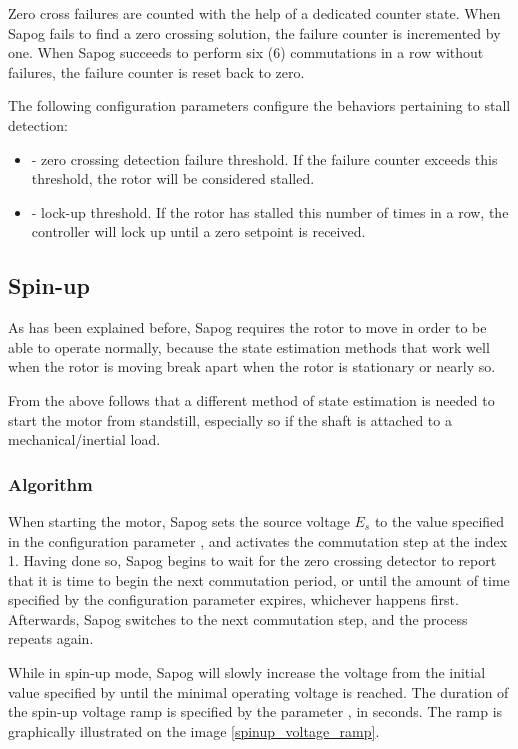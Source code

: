 \documentclass{zubaxdoc}
\begin{document}
Zero cross failures are counted with the help of a dedicated counter state.
When Sapog fails to find a zero crossing solution,
the failure counter is incremented by one.
When Sapog succeeds to perform six (6) commutations in a row without failures,
the failure counter is reset back to zero.

The following configuration parameters configure the behaviors pertaining to stall detection:

\begin{itemize}
\item {} - zero crossing detection failure threshold.
If the failure counter exceeds this threshold, the rotor will be considered stalled.
\item {} - lock-up threshold.
If the rotor has stalled this number of times in a row,
the controller will lock up until a zero setpoint is received.
\end{itemize}

\subsection{Spin-up}

As has been explained before, Sapog requires the rotor to move in order to be able to operate normally,
because the state estimation methods that work well when the rotor is moving break apart when the rotor is
stationary or nearly so.

From the above follows that a different method of state estimation is needed to start the motor
from standstill, especially so if the shaft is attached to a mechanical/inertial load.

\subsubsection{Algorithm}

When starting the motor, Sapog sets the source voltage $E_s$ to the value specified in the
configuration parameter , and activates the commutation step at the index 1.
Having done so, Sapog begins to wait for the zero crossing detector to report that it is time to
begin the next commutation period, or until the amount of time specified by the configuration parameter
 expires, whichever happens first.
Afterwards, Sapog switches to the next commutation step, and the process repeats again.

While in spin-up mode, Sapog will slowly increase the voltage from the initial value specified
by  until the minimal operating voltage  is reached.
The duration of the spin-up voltage ramp is specified by the parameter ,
in seconds.
The ramp is graphically illustrated on the image \ref{spinup_voltage_ramp}.
\end{document}
